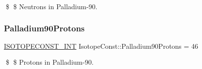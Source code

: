 \$ \$ Neutrons in Palladium-\/90. \mbox{\label{group___isotope_const-_palladium-_pd90_gadc101ec7ca652fd79f623a062336d3fd}} 
\subsubsection{\texorpdfstring{Palladium90\+Protons}{Palladium90Protons}}
{\footnotesize\ttfamily \mbox{\hyperlink{group___isotope_const-_macros_ga5f18360b3e99483a35c32d789e62621c}{I\+S\+O\+T\+O\+P\+E\+C\+O\+N\+S\+T\+\_\+\+I\+NT}} Isotope\+Const\+::\+Palladium90\+Protons = 46}

\$ \$ Protons in Palladium-\/90. 